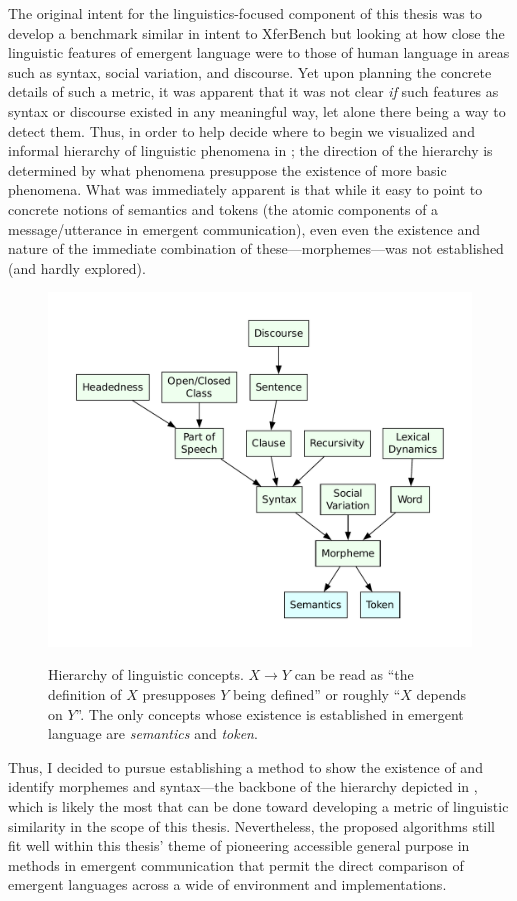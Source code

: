 The original intent for the linguistics-focused component of this thesis was to develop a benchmark similar in intent to XferBench but looking at how close the linguistic features of emergent language were to those of human language in areas such as syntax, social variation, and discourse.
Yet upon planning the concrete details of such a metric, it was apparent that it was not clear \emph{if} such features as syntax or discourse existed in any meaningful way, let alone there being a way to detect them.
Thus, in order to help decide where to begin we visualized and informal hierarchy of linguistic phenomena in ; the direction of the hierarchy is determined by what phenomena presuppose the existence of more basic phenomena.
What was immediately apparent is that while it easy to point to concrete notions of semantics and tokens (the atomic components of a message/utterance in emergent communication), even even the existence and nature of the immediate combination of these---morphemes---was not established (and hardly explored).

\begin{figure}
  \centering
  \includegraphics[width=0.85\linewidth]{assets/linguistic-dag}
  \caption{%
    Hierarchy of linguistic concepts.
    $X\rightarrow Y$ can be read as ``the definition of $X$ presupposes $Y$ being defined'' or roughly ``$X$ depends on $Y$''.
    The only concepts whose existence is established in emergent language are \emph{semantics} and \emph{token}.}
  \unskip\label{fig:linguistic-dag}
\end{figure}

Thus, I decided to pursue establishing a method to show the existence of and identify morphemes and syntax---the backbone of the hierarchy depicted in , which is likely the most that can be done toward developing a metric of linguistic similarity in the scope of this thesis.
Nevertheless, the proposed algorithms still fit well within this thesis' theme of pioneering accessible general purpose in methods in emergent communication that permit the direct comparison of emergent languages across a wide of environment and implementations.
